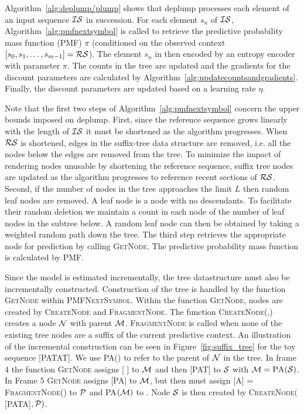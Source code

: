 Algorithm~\ref{alg:deplump/plump} shows that deplump processes each element of an input sequence $\IS$ in succession.  For each element $s_n$ of $\IS$, Algorithm~\ref{alg:pmfnextsymbol} is called to retrieve the predictive probability mass function (PMF) $\pi$ (conditioned on the observed context $[s_0, s_1, \ldots, s_{m-1}] = \RS$).  The element $s_n$ in then encoded by an entropy encoder with parameter $\pi$.  The counts in the tree are updated and the gradients for the discount parameters are calculated by Algorithm~\ref{alg:updatecountsandgradients}.  Finally, the discount parameters are updated based on a learning rate $\eta$.

Note that the first two steps of Algorithm~\ref{alg:pmfnextsymbol} concern the upper bounds imposed on deplump.  First, since the reference sequence grows linearly with the length of $\IS$ it must be shortened as the algorithm progresses.  When $\RS$ is shortened, edges in the suffix-tree data structure are removed, i.e. all the nodes below the edges are removed from the tree.  To minimize the impact of rendering nodes unusable by shortening the reference sequence, suffix tree nodes are updated as the algorithm progresses to reference recent sections of $\RS$. Second, if the number of nodes in the tree approaches the limit $L$ then random leaf nodes are removed.  A leaf node is a node with no descendants. To facilitate their random deletion we maintain a count in each node of the number of leaf nodes in the subtree below.  A random leaf node can then be obtained by taking a weighted random path down the tree.  The third step retrieves the appropriate node for prediction by calling \textsc{GetNode}. The predictive probability mass function is calculated by \textsc{PMF}.

Since the model is estimated incrementally, the tree datastructure must also be incrementally constructed.  Construction of the tree is handled by the function \textsc{GetNode} within \textsc{PMFNextSymbol}.  Within the function \textsc{GetNode}, nodes are created by \textsc{CreateNode} and \textsc{FragmentNode}. The function \textsc{CreateNode(\N,\M)} creates a node $\N$ with parent $\M$. \textsc{FragmentNode} is called when none of the existing tree nodes are a suffix of the current predictive context.  An illustration of the incremental construction can be seen in Figure~\ref{fig:suffix_tree} for the toy sequence [PATAT].  We use \textsc{PA}(\N) to refer to the parent of $\N$ in the tree.  In frame 4 the function \textsc{GetNode} assigns [ ]  to $\M$ and then [PAT] to $\Seq$ with $\M = \textsc{PA}(\Seq)$. In Frame 5 \textsc{GetNode} assigns [PA] to $\M$, but then must assign [A] = \textsc{FragmentNode}(\M) to $\PP$ and \textsc{PA}$(\M)$ to \PP.  Node $\Seq$ is then created by \textsc{CreateNode}$($[PATA]$,\PP)$.   %

